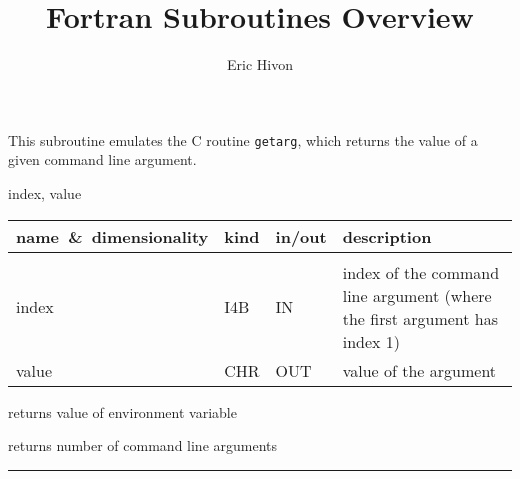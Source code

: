 \sloppy

\title{\healpix Fortran Subroutines Overview}
 \section[getArgument]{ }
\label{sub:getargument}
\author{Eric Hivon}

\begin{facility}
{This subroutine emulates the C routine {\tt getarg}, which returns the value of
a given command line argument.}
{\modExtension}
\end{facility}

\begin{f90format}
{index, value}
\end{f90format}

\begin{arguments}
{
\begin{tabular}{p{0.3\hsize} p{0.05\hsize} p{0.1\hsize} p{0.45\hsize}} \hline  
\textbf{name~\&~dimensionality} & \textbf{kind} & \textbf{in/out} & \textbf{description} \\ \hline
                   &   &   &                           \\ %
index & I4B & IN & index of the command line argument (where the first argument
                   has index 1) \\
value & CHR & OUT & value of the argument 
\end{tabular}}
\end{arguments}


\begin{related}
  \begin{sulist}{} %
  \item[\htmlref{getEnvironment}{sub:getenvironment}] returns value of
  environment variable
  \item[\htmlref{nArguments}{sub:narguments}] returns number of command line arguments
  \end{sulist}
\end{related}

\rule{\hsize}{2mm}

\newpage
